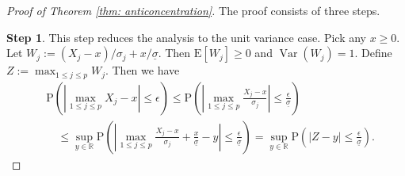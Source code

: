 \documentclass[11pt,reqno]{amsart}
\theoremstyle{definition}
\newcommand{\Ep}{{\mathrm{E}}}
\renewcommand{\Pr}{{\mathrm{P}}}
\newcommand{\RR}{\mathbb{R}}
\DeclareMathOperator{\Var}{Var}
\begin{document}
\begin{proof}[Proof of Theorem \ref{thm: anticoncentration}]
The proof consists of three steps.

{\bf Step 1}. This step reduces the analysis to the unit variance case. Pick any $x\geq0$. Let $W_{j} :=(X_{j}-x)/\sigma_{j}+x/\underline{\sigma}$.
Then $\Ep[W_{j}]\geq 0$ and $\Var (W_{j})=1$. Define $Z:= \max_{1 \leq j \leq p} W_{j}$.
Then we have
\begin{align*}
&\Pr (  |\max_{1 \leq j \leq p}X_{j}-x |\leq \epsilon ) \leq \Pr\left(\left|\max_{1 \leq j \leq p}\frac{X_{j}-x}{\sigma_j}\right|\leq \frac{\epsilon}{\underline{\sigma}}\right) \\
&\quad \leq \sup_{y\in\RR}\Pr\left(\left|\max_{1 \leq j \leq p}\frac{X_{j}-x}{\sigma_j}+\frac{x}{\underline{\sigma}}-y\right|\leq \frac{\epsilon}{\underline{\sigma}}\right) =\sup_{y\in\RR}\Pr\left(\left|Z-y\right|\leq \frac{\epsilon}{\underline{\sigma}}\right).
\end{align*}



\end{proof}
\end{document}
